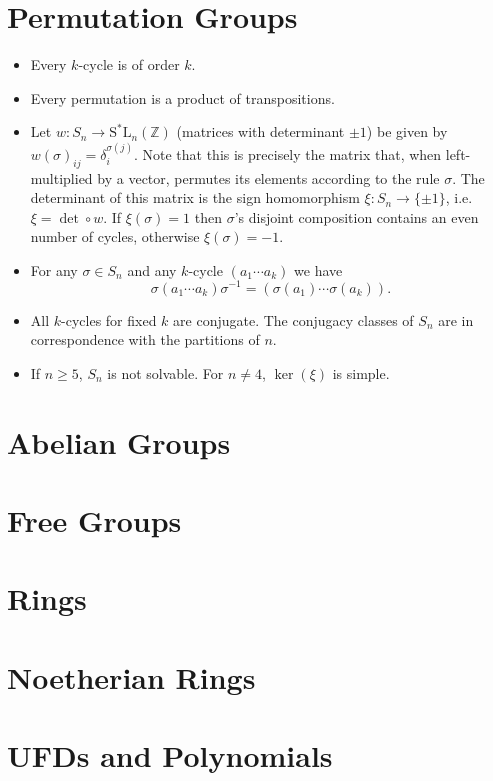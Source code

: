 \documentclass{article}
\begin{document}
\section{Permutation Groups}
\begin{itemize}
  \item{
    Every $k$-cycle is of order $k$.
  }
  \item{
    Every permutation is a product of transpositions.
  }
  \item{
    Let $w : S_n \to \mathrm{S^\ast L}_n(\mathbb{Z})$ (matrices with
    determinant $\pm 1$) be given by $w(\sigma)_{ij} =
    \delta_i^{\sigma(j)}$. Note that this is precisely the matrix that,
    when left-multiplied by a vector, permutes its elements according to
    the rule $\sigma$. The determinant of this matrix is the sign
    homomorphism $\xi : S_n \to \{ \pm 1 \}$, i.e. $\xi = \det \circ
    w$. If $\xi(\sigma) = 1$ then $\sigma$'s disjoint composition
    contains an even number of cycles, otherwise $\xi(\sigma) = -1$.
  }
  \item{
    For any $\sigma \in S_n$ and any $k$-cycle $(a_1 \cdots a_k)$ we
    have
    $$
    \sigma (a_1 \cdots a_k) \sigma^{-1}
  = (\sigma(a_1) \cdots \sigma(a_k)).
    $$
  }
  \item{
    All $k$-cycles for fixed $k$ are conjugate.
    The conjugacy classes of $S_n$ are in correspondence with the
    partitions of $n$.
  }
  \item{
    If $n \geq 5$, $S_n$ is not solvable. For $n \neq 4$,
    $\ker(\xi)$ is simple.
  }
\end{itemize}

\section{Abelian Groups}

\section{Free Groups}

\section{Rings}

\section{Noetherian Rings}

\section{UFDs and Polynomials}
\end{document}
